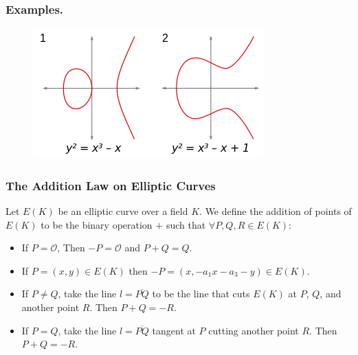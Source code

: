\documentclass{beamer}
\theoremstyle{plain} %
\theoremstyle{definition}
\theoremstyle{remark}
\begin{document}
\begin{frame}
\frametitle{Examples.}
\begin{figure}
    \centering
    \includegraphics{Figures/ECClines-3.jpg}
    \caption{}
    \label{fig:my_label}
\end{figure}


\end{frame}

\begin{frame}
\frametitle{The Addition Law on Elliptic Curves}

Let $E(K)$ be an elliptic curve over a field $K$. We define the addition of points of $E(K)$ to be the binary operation $+$ such that $\forall P,Q,R \in E(K)$: 

\begin{itemize}
    \item If $P=\mathcal{O}$, Then $-P=\mathcal{O}$ and $P+Q=Q$.
    
    \item If $P=(x,y) \in E(K)$ then $-P=(x,-a_1x-a_3-y) \in E(K)$.
    
    \item If $P \neq Q$, take the line $l=\overline{PQ}$ to be the line that cuts $E(K)$ at $P$, $Q$, and another point $R$. Then $P+Q=-R$.
    
    \item If $P = Q$, take the line $l=\overline{PQ}$ tangent at $P$ cutting another point $R$. Then $P+Q=-R$.
\end{itemize}


\end{frame}
\end{document}
